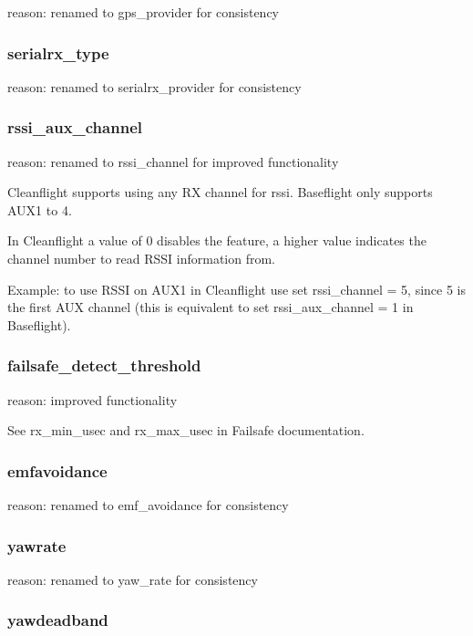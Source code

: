 reason\+: renamed to {\ttfamily gps\+\_\+provider} for consistency

\subsubsection*{serialrx\+\_\+type}

reason\+: renamed to {\ttfamily serialrx\+\_\+provider} for consistency

\subsubsection*{rssi\+\_\+aux\+\_\+channel}

reason\+: renamed to {\ttfamily rssi\+\_\+channel} for improved functionality

Cleanflight supports using any R\+X channel for rssi. Baseflight only supports A\+U\+X1 to 4.

In Cleanflight a value of 0 disables the feature, a higher value indicates the channel number to read R\+S\+S\+I information from.

Example\+: to use R\+S\+S\+I on A\+U\+X1 in Cleanflight use {\ttfamily set rssi\+\_\+channel = 5}, since 5 is the first A\+U\+X channel (this is equivalent to {\ttfamily set rssi\+\_\+aux\+\_\+channel = 1} in Baseflight).

\subsubsection*{failsafe\+\_\+detect\+\_\+threshold}

reason\+: improved functionality

See {\ttfamily rx\+\_\+min\+\_\+usec} and {\ttfamily rx\+\_\+max\+\_\+usec} in Failsafe documentation.

\subsubsection*{emfavoidance}

reason\+: renamed to {\ttfamily emf\+\_\+avoidance} for consistency

\subsubsection*{yawrate}

reason\+: renamed to {\ttfamily yaw\+\_\+rate} for consistency

\subsubsection*{yawdeadband}

